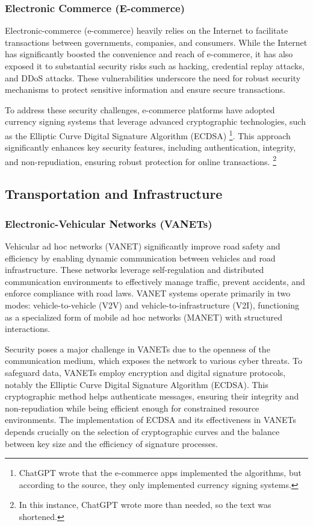 \subsubsection{Electronic Commerce (E-commerce)}

Electronic-commerce (e-commerce) heavily relies on the Internet to facilitate transactions between governments, companies, and consumers. While the Internet has significantly boosted the convenience and reach of e-commerce, it has also exposed it to substantial security risks such as hacking, credential replay attacks, and DDoS attacks. These vulnerabilities underscore the need for robust security mechanisms to protect sensitive information and ensure secure transactions.

To address these security challenges, e-commerce platforms have adopted currency signing systems that leverage advanced cryptographic technologies, such as the Elliptic Curve Digital Signature Algorithm (ECDSA) \footnote{ChatGPT wrote that the e-commerce apps implemented the algorithms, but according to the source, they only implemented currency signing systems.}. This approach significantly enhances key security features, including authentication, integrity, and non-repudiation, ensuring robust protection for online transactions. \footnote{In this instance, ChatGPT wrote more than needed, so the text was shortened.}

\subsection{Transportation and Infrastructure}
\label{use-cases:transportation-and-infrastructure}

\subsubsection{Electronic-Vehicular Networks (VANETs)}

Vehicular ad hoc networks (VANET) significantly improve road safety and efficiency by enabling dynamic communication between vehicles and road infrastructure. These networks leverage self-regulation and distributed communication environments to effectively manage traffic, prevent accidents, and enforce compliance with road laws. VANET systems operate primarily in two modes: vehicle-to-vehicle (V2V) and vehicle-to-infrastructure (V2I), functioning as a specialized form of mobile ad hoc networks (MANET) with structured interactions.

Security poses a major challenge in VANETs due to the openness of the communication medium, which exposes the network to various cyber threats. To safeguard data, VANETs employ encryption and digital signature protocols, notably the Elliptic Curve Digital Signature Algorithm (ECDSA). This cryptographic method helps authenticate messages, ensuring their integrity and non-repudiation while being efficient enough for constrained resource environments. The implementation of ECDSA and its effectiveness in VANETs depends crucially on the selection of cryptographic curves and the balance between key size and the efficiency of signature processes.

